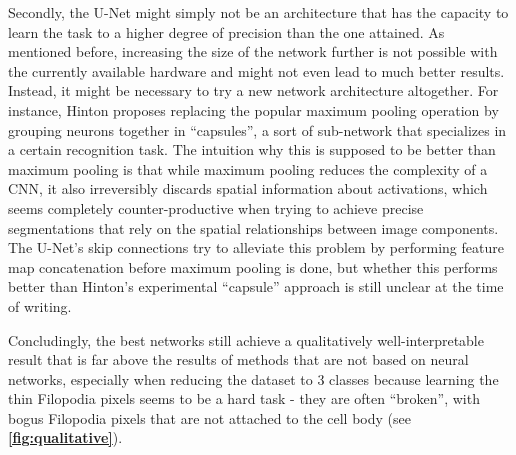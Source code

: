 Secondly, the U-Net might simply not be an architecture that has the capacity to learn the task to a higher degree of precision than the one attained. As mentioned before, increasing the size of the network further is not possible with the currently available hardware and might not even lead to much better results. Instead, it might be necessary to try a new network architecture altogether. For instance, Hinton \cite{capsules} proposes replacing the popular maximum pooling operation by grouping neurons together in ``capsules'', a sort of sub-network that specializes in a certain recognition task. The intuition why this is supposed to be better than maximum pooling is that while maximum pooling reduces the complexity of a CNN, it also irreversibly discards spatial information about activations, which seems completely counter-productive when trying to achieve precise segmentations that rely on the spatial relationships between image components. The U-Net's skip connections try to alleviate this problem by performing feature map concatenation before maximum pooling is done, but whether this performs better than Hinton's experimental ``capsule'' approach is still unclear at the time of writing.

Concludingly, the best networks still achieve a qualitatively well-interpretable result that is far above the results of methods that are not based on neural networks, especially when reducing the dataset to 3 classes because learning the thin Filopodia pixels seems to be a hard task - they are often ``broken'', with bogus Filopodia pixels that are not attached to the cell body (see \textbf{\ref{fig:qualitative}}).